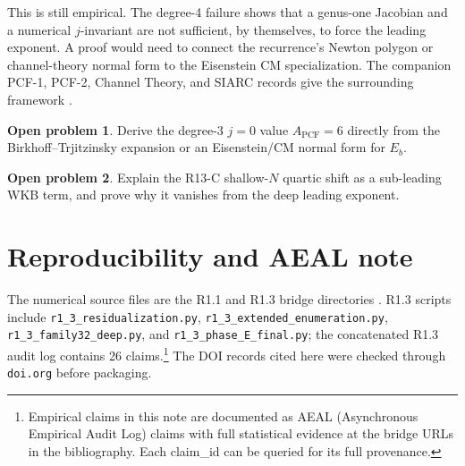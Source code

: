 \documentclass[11pt]{amsart}
\theoremstyle{plain}
\theoremstyle{definition}
\newtheorem{problem}{Open problem}
\newcommand{\PCF}{A_{\mathrm{PCF}}}
\begin{document}
This is still empirical.  The degree-4 failure shows that a genus-one Jacobian and a numerical \(j\)-invariant are not sufficient, by themselves, to force the leading exponent.  A proof would need to connect the recurrence's Newton polygon or channel-theory normal form to the Eisenstein CM specialization.  The companion PCF-1, PCF-2, Channel Theory, and SIARC records give the surrounding framework \cite{pcf1v13,pcf2v12,channelv12,siarcumbrella}.

\begin{problem}
Derive the degree-3 \(j=0\) value \(\PCF=6\) directly from the Birkhoff--Trjitzinsky expansion or an Eisenstein/CM normal form for \(E_b\).
\end{problem}

\begin{problem}
Explain the R13-C shallow-\(N\) quartic shift as a sub-leading WKB term, and prove why it vanishes from the deep leading exponent.
\end{problem}

\section*{Reproducibility and AEAL note}

The numerical source files are the R1.1 and R1.3 bridge directories \cite{r11bridge,r13bridge}.  R1.3 scripts include \texttt{r1\_3\_residualization.py}, \texttt{r1\_3\_extended\_enumeration.py}, \texttt{r1\_3\_family32\_deep.py}, and \texttt{r1\_3\_phase\_E\_final.py}; the concatenated R1.3 audit log contains 26 claims.\footnote{Empirical claims in this note are documented as AEAL (Asynchronous Empirical Audit Log) claims with full statistical evidence at the bridge URLs in the bibliography. Each claim\_id can be queried for its full provenance.}  The DOI records cited here were checked through \texttt{doi.org} before packaging.

\clearpage


\end{document}
